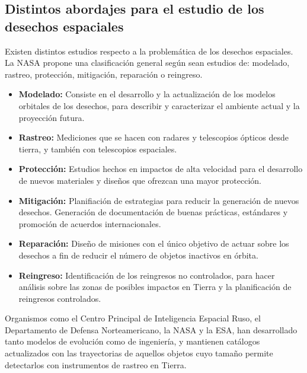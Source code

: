 \subsection*{Distintos abordajes para el estudio de los desechos espaciales}
Existen distintos estudios respecto a la problem\'atica de los desechos espaciales. La \ac{NASA} propone una clasificaci\'on general seg\'un sean estudios de: modelado, rastreo, protecci\'on, mitigaci\'on, reparaci\'on o reingreso.\\
\begin{itemize}
\item {\bf{Modelado:}} Consiste en el desarrollo y la actualizaci\'on de los modelos orbitales de los desechos, para describir y caracterizar el ambiente actual y la proyecci\'on futura.\\
\item {\bf{Rastreo:}} Mediciones que se hacen con radares y telescopios \'opticos desde tierra, y tambi\'en con telescopios espaciales.\\
\item {\bf{Protecci\'on:}} Estudios hechos en impactos de alta velocidad para el desarrollo de nuevos materiales y dise\~nos que ofrezcan una mayor protecci\'on.\\
\item {\bf{Mitigaci\'on:}} Planifiaci\'on de estrategias para reducir la generaci\'on de nuevos desechos. Generaci\'on de documentaci\'on  de buenas pr\'acticas, est\'andares y promoci\'on de acuerdos internacionales.\\
\item {\bf{Reparaci\'on:}} Dise\~no de misiones con el \'unico objetivo de actuar sobre los desechos a fin de reducir el n\'umero de objetos inactivos en \'orbita.\\
\item {\bf{Reingreso:}} Identificaci\'on de los reingresos no controlados, para hacer an\'alisis sobre las zonas de posibles impactos en Tierra y la planificaci\'on de reingresos controlados.\\
\end{itemize}

Organismos como el Centro Principal de Inteligencia Espacial Ruso, el Departamento de Defensa Norteamericano, la NASA y la \ac{ESA}, han desarrollado tanto modelos de evoluci\'on como de ingenier\'ia, y mantienen cat\'alogos actualizados con las trayectorias de aquellos objetos cuyo tama\~no permite detectarlos con instrumentos de rastreo en Tierra.\\

